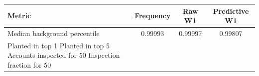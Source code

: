 \begin{tabular}{lccc}
\toprule
Metric & Frequency & Raw W1 & Predictive W1 \\
\midrule
Median background percentile & 0.99993 & 0.99997 & 0.99807 \\
Planted in top 1%
Planted in top 5%
Accounts inspected for 50%
Inspection fraction for 50%
\bottomrule
\end{tabular}
